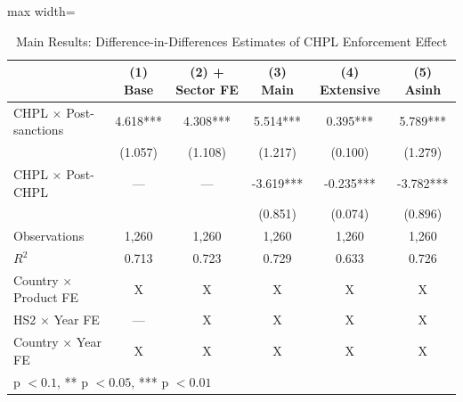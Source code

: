 \begin{table}[t]
\centering
\caption{Main Results: Difference-in-Differences Estimates of CHPL Enforcement Effect}
\label{tab:main}
\begin{adjustbox}{max width=\textwidth}
\begin{tabular}{lccccc}
\toprule
 & (1) Base & (2) + Sector FE & (3) Main & (4) Extensive & (5) Asinh \\
\midrule
CHPL $\times$ Post-sanctions & 4.618*** & 4.308*** & 5.514*** & 0.395*** & 5.789*** \\
 & (1.057) & (1.108) & (1.217) & (0.100) & (1.279) \\
CHPL $\times$ Post-CHPL & --- & --- & -3.619*** & -0.235*** & -3.782*** \\
 & & & (0.851) & (0.074) & (0.896) \\
\midrule
Observations & 1,260 & 1,260 & 1,260 & 1,260 & 1,260 \\
$R^2$ & 0.713 & 0.723 & 0.729 & 0.633 & 0.726 \\
Country $\times$ Product FE & X & X & X & X & X \\
HS2 $\times$ Year FE & --- & X & X & X & X \\
Country $\times$ Year FE & X & X & X & X & X \\
\bottomrule
\multicolumn{6}{l}{\footnotesize * p $< 0.1$, ** p $< 0.05$, *** p $< 0.01$} \\
\end{tabular}
\end{adjustbox}
\end{table}
